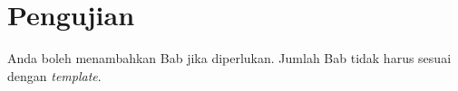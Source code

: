 \chapter{Pengujian}

Anda boleh menambahkan Bab jika diperlukan. Jumlah Bab tidak harus sesuai dengan \textit{template}. 
